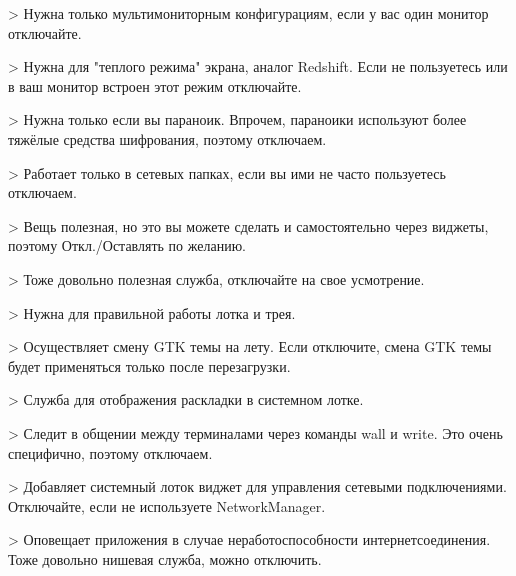 \documentclass[letterpaper,10pt,russian,openany]{sphinxmanual}
\begin{document}
\sphinxAtStartPar
{} \sphinxhyphen{}> Нужна только мультимониторным конфигурациям,
если у вас один монитор \sphinxhyphen{} отключайте.

\sphinxAtStartPar
{} \sphinxhyphen{}> Нужна для "теплого режима" экрана, аналог Redshift.
Если не пользуетесь или в ваш монитор встроен этот режим \sphinxhyphen{} отключайте.

\sphinxAtStartPar
{} \sphinxhyphen{}> Нужна только если вы параноик.
Впрочем, параноики используют более тяжёлые средства шифрования, поэтому отключаем.

\sphinxAtStartPar
{} \sphinxhyphen{}> Работает только в сетевых папках,
если вы ими не часто пользуетесь \sphinxhyphen{} отключаем.

\sphinxAtStartPar
{} \sphinxhyphen{}> Вещь полезная, но это вы можете сделать и самостоятельно через виджеты,
поэтому Откл./Оставлять по желанию.

\sphinxAtStartPar
{} \sphinxhyphen{}> Тоже довольно полезная служба, отключайте на свое усмотрение.

\sphinxAtStartPar
{} \sphinxhyphen{}> Нужна для правильной работы лотка и трея.

\sphinxAtStartPar
{} \sphinxhyphen{}> Осуществляет смену GTK темы на лету.
Если отключите, смена GTK темы будет применяться только после перезагрузки.

\sphinxAtStartPar
{} \sphinxhyphen{}> Служба для отображения раскладки в системном лотке.

\sphinxAtStartPar
{} \sphinxhyphen{}> Следит в общении между терминалами через команды wall и write.
Это очень специфично, поэтому отключаем.

\sphinxAtStartPar
{} \sphinxhyphen{}> Добавляет системный лоток виджет для управления сетевыми подключениями.
Отключайте, если не используете NetworkManager.

\sphinxAtStartPar
{} \sphinxhyphen{}> Оповещает приложения в случае неработоспособности интернет\sphinxhyphen{}соединения.
Тоже довольно нишевая служба, можно отключить.
\end{document}
